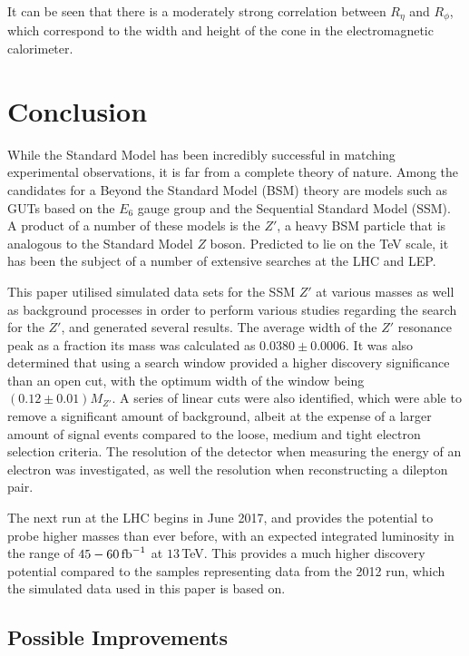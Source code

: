 \documentclass{article}
\begin{document}
It can be seen that there is a moderately strong correlation between $R_{\eta}$ and $R_{\phi}$, which correspond to the width and height of the cone in the electromagnetic calorimeter. %

\section{Conclusion}
\label{sec:Conclusion}

While the Standard Model has been incredibly successful in matching experimental observations, it is far from a complete theory of nature. Among the candidates for a Beyond the Standard Model (BSM) theory are models such as GUTs based on the $E_6$ gauge group and the Sequential Standard Model (SSM). A product of a number of these models is the $Z'$, a heavy BSM particle that is analogous to the Standard Model $Z$ boson. Predicted to lie on the TeV scale, it has been the subject of a number of extensive searches at the LHC and LEP. 

This paper utilised  simulated data sets for the SSM $Z'$ at various masses as well as background processes in order to perform various studies regarding the search for the $Z'$, and generated several results. 
The average width of the $Z'$ resonance peak as a fraction its mass was calculated as $0.0380\pm0.0006$. 
It was also determined that using a search window provided a higher discovery significance than an open cut, with the optimum width of the window being $(0.12\pm0.01)M_{Z'}$.
A series of linear cuts were also identified, which were able to remove a significant amount of background, albeit at the expense of a larger amount of signal events compared to the loose, medium and tight electron selection criteria. 
The resolution of the detector when measuring the energy of an electron was investigated, as well the resolution when reconstructing a dilepton pair. 

The next run at the LHC begins in June 2017, and provides the potential to probe higher masses than ever before, with an expected integrated luminosity in the range of $45-60\,\rm{fb}^{-1}$ at $13\,$TeV. This provides a much higher discovery potential compared to the samples representing data from the 2012 run, which the simulated data used in this paper is based on. 

\subsection{Possible Improvements}
\end{document}
